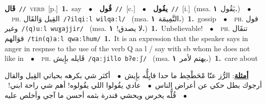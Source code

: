\documentclass[10pt,a4paper,twoside]{article} %
\begin{document}
\begin{multicols}{2}
{\setlength\topsep{0pt}\textbf{\foreignlanguage{arabic}{قَال}}\ {\color{gray}\texttt{//}\color{black}}\ \textsc{verb}\ [p.]\ \textbf{1.}~say\ \ $\bullet$\ \ \setlength\topsep{0pt}\textbf{\foreignlanguage{arabic}{قُول}}\ {\color{gray}\texttt{//}\color{black}}\ [c.]\ \ $\bullet$\ \ \setlength\topsep{0pt}\textbf{\foreignlanguage{arabic}{يقُول}}\ {\color{gray}\texttt{//}\color{black}}\ [i.]\ \color{gray}(msa. \foreignlanguage{arabic}{يَقُول}~\foreignlanguage{arabic}{\textbf{١.}})\color{black}\ \ $\bullet$\ \ \textsc{ph.} \color{gray} \foreignlanguage{arabic}{القِيل وَالقَال}\color{black}\ {\color{gray}\texttt{/{\sffamily ʔilqiːl wilqaːl}/}\color{black}}\ \color{gray} (msa. \foreignlanguage{arabic}{النَّمِيمَة}~\foreignlanguage{arabic}{\textbf{١.}})\color{black}\ \textbf{1.}~gossip\ \ $\bullet$\ \ \textsc{ph.} \color{gray} \foreignlanguage{arabic}{قول وغير}\color{black}\ {\color{gray}\texttt{/{\sffamily (q)uːl wuɣajjir}/}\color{black}}\ \color{gray} (msa. \foreignlanguage{arabic}{لا يصدق!}~\foreignlanguage{arabic}{\textbf{١.}})\color{black}\ \textbf{1.}~Unbelievable!\ \ $\bullet$\ \ \textsc{ph.} \color{gray} \foreignlanguage{arabic}{تنقَال قوَالهم}\color{black}\ {\color{gray}\texttt{/{\sffamily tin(q)aːl qwaːlhum}/}\color{black}}\ \textbf{1.}~It is an expression that the speaker says in anger in respnse to the use of the verb Q aa l / say with sb whom he does not like in\ \ $\bullet$\ \ \textsc{ph.} \color{gray} \foreignlanguage{arabic}{قَايله بإِيش}\color{black}\ {\color{gray}\texttt{/{\sffamily qaːjillo bʔeːʃ}/}\color{black}}\ \color{gray} (msa. \foreignlanguage{arabic}{يهتم لأمر}~\foreignlanguage{arabic}{\textbf{١.}})\color{black}\ \textbf{1.}~care about\  \begin{flushright}\color{gray}\foreignlanguage{arabic}{\textbf{\underline{\foreignlanguage{arabic}{أمثلة}}}: الرُّز عنّا مْحَطْحِط ما حدا قايِلُّه بإِيش\ $\bullet$\ \  أكثر شي بكرهه بحياتي القِيل والقال أرجوك بطل حكي عن أعراض الناس\ $\bullet$\ \  عادي يقُولوا اللي يقُولوه! أهم شي راحة ابني!\ $\bullet$\ \  قُلُّه يخرس ويحشي قندرة بثمه أحسن ما آجي وأخلص عليه}\end{flushright}\color{black}} \vspace{2mm}


\end{multicols}
\end{document}
